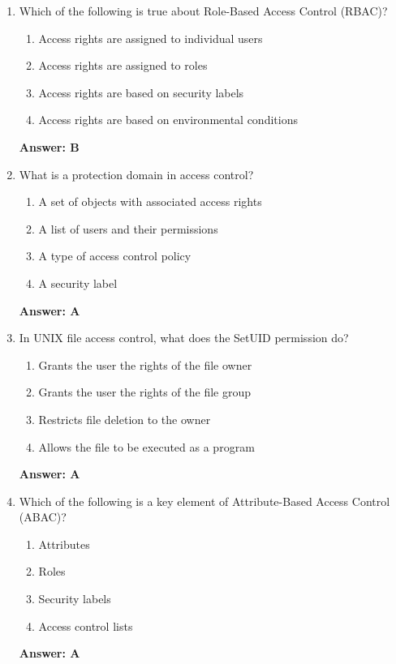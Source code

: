 \documentclass{article}
\begin{document}
\begin{enumerate}
    \item Which of the following is true about Role-Based Access Control (RBAC)?
    \begin{enumerate}[label=\Alph*)]
        \item Access rights are assigned to individual users
        \item Access rights are assigned to roles
        \item Access rights are based on security labels
        \item Access rights are based on environmental conditions
    \end{enumerate}
    \textbf{Answer: B}

    \item What is a protection domain in access control?
    \begin{enumerate}[label=\Alph*)]
        \item A set of objects with associated access rights
        \item A list of users and their permissions
        \item A type of access control policy
        \item A security label
    \end{enumerate}
    \textbf{Answer: A}

    \item In UNIX file access control, what does the SetUID permission do?
    \begin{enumerate}[label=\Alph*)]
        \item Grants the user the rights of the file owner
        \item Grants the user the rights of the file group
        \item Restricts file deletion to the owner
        \item Allows the file to be executed as a program
    \end{enumerate}
    \textbf{Answer: A}

    \item Which of the following is a key element of Attribute-Based Access Control (ABAC)?
    \begin{enumerate}[label=\Alph*)]
        \item Attributes
        \item Roles
        \item Security labels
        \item Access control lists
    \end{enumerate}
    \textbf{Answer: A}


\end{enumerate}
\end{document}
